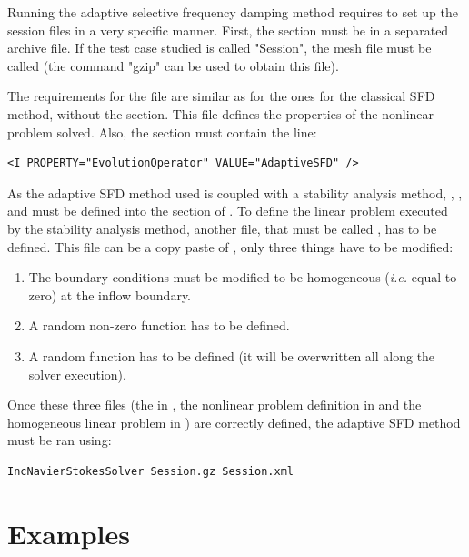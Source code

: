 Running the adaptive selective frequency damping method requires to set up the session files in a very specific manner. First, the  section must be in a separated archive file. If the test case studied is called "Session", the mesh file must be called  (the command "gzip" can be used to obtain this file).

The requirements for the file  are similar as for the ones for the classical SFD method, without the  section. This file defines the properties of the nonlinear problem solved. Also, the  section must contain the line:
\begin{lstlisting}[style=XMLStyle]
<I PROPERTY="EvolutionOperator" VALUE="AdaptiveSFD" />
\end{lstlisting}

As the adaptive SFD method used is coupled with a stability analysis method, , ,  and  must be defined into the  section of . To define the linear problem executed by the stability analysis method, another file, that must be called , has to be defined. This file can be a copy paste of , only three things have to be modified:
\begin{enumerate}
\item The boundary conditions must be modified to be homogeneous (\textit{i.e.} equal to zero) at the inflow boundary.
\item A random non-zero function  has to be defined.
\item A random function  has to be defined (it will be overwritten all along the solver execution).
\end{enumerate}

Once these three files (the   in , the nonlinear problem definition in  and the homogeneous linear problem in ) are correctly defined, the adaptive SFD method must be ran using:

\begin{lstlisting}[style=BashInputStyle]
IncNavierStokesSolver Session.gz Session.xml
\end{lstlisting}



\section{Examples}

